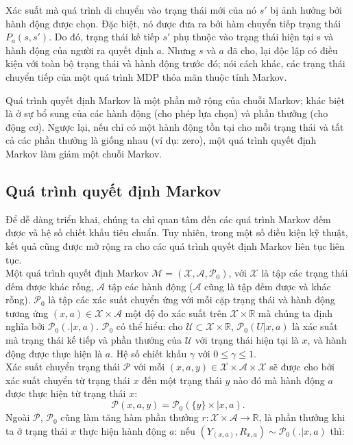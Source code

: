 \documentclass[14pt,a4paper,oneside]{report}		%
\begin{document}
Xác suất mà quá trình di chuyển vào trạng thái mới của nó $s'$ bị ảnh hưởng bởi hành động được chọn. Đặc biệt, nó được đưa ra bởi hàm chuyển tiếp trạng thái $P_a(s,s')$. Do đó, trạng thái kế tiếp $s'$ phụ thuộc vào trạng thái hiện tại s và hành động của người ra quyết định $a$. Nhưng $s$ và $a$ đã cho, lại độc lập có điều kiện với toàn bộ trạng thái và hành động trước đó; nói cách khác, các trạng thái chuyển tiếp của một quá trình MDP thỏa mãn thuộc tính Markov.

Quá trình quyết định Markov là một phần mở rộng của chuỗi Markov; khác biệt là ở sự bổ sung của các hành động (cho phép lựa chọn) và phần thưởng (cho động cơ). Ngược lại, nếu chỉ có một hành động tồn tại cho mỗi trạng thái và tất cả các phần thưởng là giống nhau (ví dụ: zero), một quá trình quyết định Markov làm giảm một chuỗi Markov.
\subsection{Quá trình quyết định Markov}
Để dễ dàng triển khai, chúng ta chỉ quan tâm đến các quá trình Markov đếm được và hệ số chiết khấu tiêu chuẩn. Tuy nhiên, trong một số điều kiện kỹ thuật, kết quả cũng được mở rộng ra cho các quá trình quyết định Markov liên tục liên tục.\\
Một quá trình quyết định Markov $\mathcal{M} = (\mathcal{X},\mathcal{A},\mathcal{P}_0)$, với $\mathcal{X}$ là tập các trạng thái đếm được khác rỗng, $\mathcal{A}$ tập các hành động ($\mathcal{A}$ cũng là tập đếm được và khác rỗng). $\mathcal{P}_0$ là tập các xác suất chuyển ứng với mỗi cặp trạng thái và hành động tương ứng $(x,a) \in \mathcal{X}\times\mathcal{A}$ một độ đo xác suất trên $\mathcal{X}\times\mathbb{R}$ mà chúng ta định nghĩa bởi $\mathcal{P}_0(.|x,a)$. $\mathcal{P}_0$ có thể hiểu: cho $\mathcal{U}\subset\mathcal{X}\times\mathbb{R}$, $\mathcal{P}_0(U|x,a)$ là xác suất mà trạng thái kế tiếp và phần thưởng của $\mathcal{U}$ với trạng thái hiện tại là $x$, và hành động được thực hiện là $a$. Hệ số chiết khấu $\gamma$ với $0\leq \gamma\leq 1$.\\
Xác suất chuyển trạng thái $\mathcal{P}$ với mỗi $(x,a,y)\in\mathcal{X}\times\mathcal{A}\times\mathcal{X}$ sẽ được cho bởi xác suất chuyển từ trạng thái $x$ đến một trạng thái $y$ nào đó mà hành động $a$ được thực hiện từ trạng thái $x$:
$$\mathcal{P}(x,a,y)=\mathcal{P}_0(\{y\}\times|x,a).$$
Ngoài $\mathcal{P}$, $\mathcal{P}_0$ cũng làm tăng hàm phần thưởng $r:\mathcal{X}\times\mathcal{A}\rightarrow\mathbb{R}$, là phần thưởng khi ta ở trạng thái $x$ thực hiện hành động $a$: nếu $(Y_{(x,a)},R_{x,a})\sim\mathcal{P}_0(.|x,a)$ thì:
\end{document}
